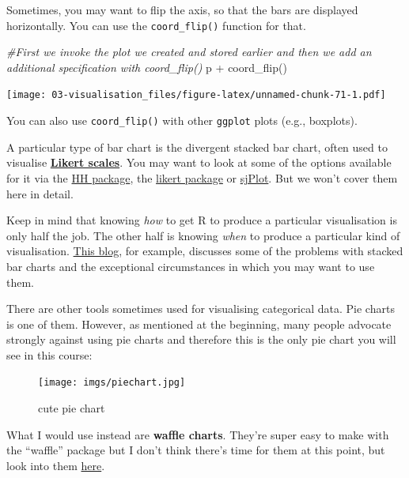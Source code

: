 \documentclass[
]{book}
\newenvironment{Shaded}{\begin{snugshade}}{\end{snugshade}}
\newcommand{\CommentTok}[1]{\textcolor[rgb]{0.56,0.35,0.01}{\textit{#1}}}
\newcommand{\FunctionTok}[1]{\textcolor[rgb]{0.00,0.00,0.00}{#1}}
\newcommand{\NormalTok}[1]{#1}
\newcommand{\SpecialCharTok}[1]{\textcolor[rgb]{0.00,0.00,0.00}{#1}}
\begin{document}
Sometimes, you may want to flip the axis, so that the bars are displayed horizontally. You can use the \texttt{coord\_flip()} function for that.

\begin{Shaded}
\begin{Highlighting}[]
\CommentTok{\#First we invoke the plot we created and stored earlier and then we add an additional specification with coord\_flip()}
\NormalTok{p }\SpecialCharTok{+} \FunctionTok{coord\_flip}\NormalTok{()}
\end{Highlighting}
\end{Shaded}

\texttt{[image: 03-visualisation\_files/figure-latex/unnamed-chunk-71-1.pdf]}

You can also use \texttt{coord\_flip()} with other \texttt{ggplot} plots (e.g., boxplots).

A particular type of bar chart is the divergent stacked bar chart, often used to visualise \href{http://en.wikipedia.org/wiki/Likert_scale}{\textbf{Likert scales}}. You may want to look at some of the options available for it via the \href{http://www.jstatsoft.org/v57/i05/paper}{HH package}, the \href{http://jason.bryer.org/likert/}{likert package} or \href{http://strengejacke.wordpress.com/2013/07/17/plotting-likert-scales-net-stacked-distributions-with-ggplot-rstats/}{sjPlot}. But we won't cover them here in detail.

Keep in mind that knowing \emph{how} to get R to produce a particular visualisation is only half the job. The other half is knowing \emph{when} to produce a particular kind of visualisation. \href{https://solomonmessing.wordpress.com/2014/10/11/when-to-use-stacked-barcharts/}{This blog}, for example, discusses some of the problems with stacked bar charts and the exceptional circumstances in which you may want to use them.

There are other tools sometimes used for visualising categorical data. Pie charts is one of them. However, as mentioned at the beginning, many people advocate strongly against using pie charts and therefore this is the only pie chart you will see in this course:

\begin{figure}
\centering
\texttt{[image: imgs/piechart.jpg]}
\caption{cute pie chart}
\end{figure}

What I would use instead are \textbf{waffle charts}. They're super easy to make with the ``waffle'' package but I don't think there's time for them at this point, but look into them \href{https://www.r-bloggers.com/making-waffle-charts-in-r-with-the-new-waffle-package/}{here}.
\end{document}
